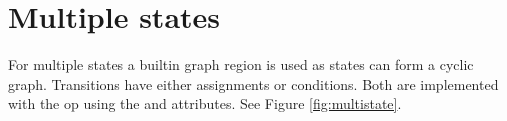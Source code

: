 \section{Multiple states} \label{section:multistate}
For multiple states a builtin graph region is used as states can form a cyclic graph. Transitions have either assignments or conditions. Both are implemented with the  op using the  and  attributes. See Figure \ref{fig:multistate}.

